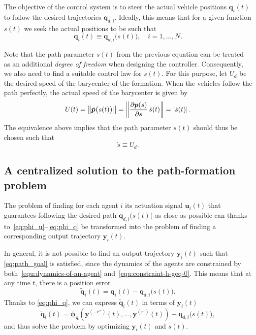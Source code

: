 The objective of the control system is to steer the actual vehicle positions $\bm{q}_i(t)$ to follow the desired trajectories $\bm{q}_{d,i}$. Ideally, this means that for a given function $s(t)$ we seek the actual positions to be such that
\begin{equation}
    \bm{q}_i(t)
    \equiv
    \bm{q}_{d,i}\big(s(t)\big),
    \quad i = 1, \ldots, N.
    \label{eq:path_goal}
\end{equation} 

Note that the path parameter $s(t)$ from the previous equation can be treated as an additional \emph{degree of freedom} when designing the controller. Consequently, we also need to find a suitable control law for $s(t)$. For this purpose, let $U_d$ be the desired speed of the barycenter of the formation. %
When the vehicles follow the path perfectly, the actual speed of the barycenter is given by
\begin{equation}
    U(t)
    =
    \left\|\dot{\bm{p}} \big( s(t) \big)\right\|
    =
    \left\|\frac{\partial \bm{p}(s)}{\partial s}\,\dot{s}(t) \right\| = \left|\dot{s}(t)\right|.
\end{equation}
The equivalence above implies that the path parameter $s(t)$ should thus be chosen such that
\begin{equation}
    \dot{s} \equiv U_d.
    \label{eq:param_goal}
\end{equation}



\subsection{A centralized solution to the path-formation problem}
\label{ssec:}



The problem of finding for each agent $i$ its actuation signal $\bm{u}_i(t)$ that guarantees following the desired path $\bm{q}_{d,i} \big( s(t) \big)$ as close as possible can thanks to~\eqref{eq:phi_u}--\eqref{eq:phi_q} be transformed into the problem of finding a corresponding output trajectory $\bm{y}_i(t)$.

In general, it is not possible to find an output trajectory $\bm{y}_i(t)$ such that \eqref{eq:path_goal} is satisfied, since the dynamics of the agents are constrained by both~\eqref{equ:dynamics-of-an-agent} and~\eqref{equ:constraint-h-geq-0}. This means that at any time $t$, there is a position error
%
\begin{equation}
    \widetilde{\bm{q}}_i(t)
    =
    \bm{q}_i(t)
    -
    \bm{q}_{d,i} \big( s(t) \big) .
    \label{eq:q_tilde}
\end{equation}
%
Thanks to \eqref{eq:phi_q}, we can express $\widetilde{\bm{q}}_i(t)$ in terms of $\bm{y}_i(t)$
\begin{equation}
    \widetilde{\bm{q}}_i(t)
    =
    \bm{\phi}_{\bm{q}}\left(\bm{y}^{(-r'')}(t), \ldots, \bm{y}^{(r')}(t)\right)
    -
    \bm{q}_{d,i} \big( s(t) \big), \label{eq:y_tilde}
\end{equation}
and thus solve the problem by optimizing $\bm{y}_i(t)$ and $s(t)$.

